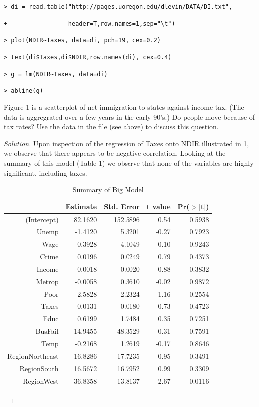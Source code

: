 \documentclass{amsart}\usepackage[]{graphicx}\usepackage[]{color}
\begin{document}
        \verb|> di = read.table("http://pages.uoregon.edu/dlevin/DATA/DI.txt",|

        \verb|+                 header=T,row.names=1,sep="\t")|

        \verb|> plot(NDIR~Taxes, data=di, pch=19, cex=0.2)|

        \verb|> text(di$Taxes,di$NDIR,row.names(di), cex=0.4)|

        \verb|> g = lm(NDIR~Taxes, data=di)|

        \verb|> abline(g)|

		Figure 1 is a scatterplot of net immigration to states against income tax.
		(The data is aggregrated over a few years in the early 90's.)
		Do people move because of tax rates?
		Use the data in the file (see above) to discuss this question.
		\begin{proof}[Solution]
		Upon inspection of the regression of Taxes onto NDIR illustrated in 1, we observe that there appears to be negative correlation.
		Looking at the summary of this model (Table 1) we observe that none of the variables are highly significant, including taxes.
\begin{table}[ht]
\centering
\begin{tabular}{rrrrr}
  \hline
 & Estimate & Std. Error & t value & Pr($>$$|$t$|$) \\ 
  \hline
(Intercept) & 82.1620 & 152.5896 & 0.54 & 0.5938 \\ 
  Unemp & -1.4120 & 5.3201 & -0.27 & 0.7923 \\ 
  Wage & -0.3928 & 4.1049 & -0.10 & 0.9243 \\ 
  Crime & 0.0196 & 0.0249 & 0.79 & 0.4373 \\ 
  Income & -0.0018 & 0.0020 & -0.88 & 0.3832 \\ 
  Metrop & -0.0058 & 0.3610 & -0.02 & 0.9872 \\ 
  Poor & -2.5828 & 2.2324 & -1.16 & 0.2554 \\ 
  Taxes & -0.0131 & 0.0180 & -0.73 & 0.4723 \\ 
  Educ & 0.6199 & 1.7484 & 0.35 & 0.7251 \\ 
  BusFail & 14.9455 & 48.3529 & 0.31 & 0.7591 \\ 
  Temp & -0.2168 & 1.2619 & -0.17 & 0.8646 \\ 
  RegionNortheast & -16.8286 & 17.7235 & -0.95 & 0.3491 \\ 
  RegionSouth & 16.5672 & 16.7952 & 0.99 & 0.3309 \\ 
  RegionWest & 36.8358 & 13.8137 & 2.67 & 0.0116 \\ 
   \hline
\end{tabular}
\caption{Summary of Big Model} 
\label{Summary of Big Model}
\end{table}


\end{proof}
\end{document}
